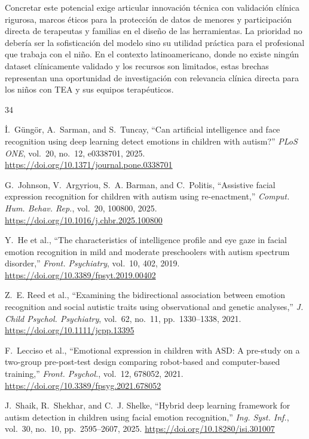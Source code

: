 \documentclass[3p,twocolumn,times]{elsarticle}
\begin{document}
	Concretar este potencial exige articular innovación técnica con validación clínica
	rigurosa, marcos éticos para la protección de datos de menores y participación
	directa de terapeutas y familias en el diseño de las herramientas. La prioridad
	no debería ser la sofisticación del modelo sino su utilidad práctica para el
	profesional que trabaja con el niño. En el contexto latinoamericano, donde no
	existe ningún dataset clínicamente validado y los recursos son limitados, estas
	brechas representan una oportunidad de investigación con relevancia clínica
	directa para los niños con TEA y sus equipos terapéuticos.
	
	\begin{thebibliography}{34}
		
		İ.~Güngör, A.~Sarman, and S.~Tuncay,
		``Can artificial intelligence and face recognition using deep learning detect
		emotions in children with autism?''
		\textit{PLoS ONE}, vol.~20, no.~12, e0338701, 2025.
		\url{https://doi.org/10.1371/journal.pone.0338701}
		
		G.~Johnson, V.~Argyriou, S.~A. Barman, and C.~Politis,
		``Assistive facial expression recognition for children with autism using
		re-enactment,''
		\textit{Comput. Hum. Behav. Rep.}, vol.~20, 100800, 2025.
		\url{https://doi.org/10.1016/j.chbr.2025.100800}
		
		Y.~He et al.,
		``The characteristics of intelligence profile and eye gaze in facial emotion
		recognition in mild and moderate preschoolers with autism spectrum disorder,''
		\textit{Front. Psychiatry}, vol.~10, 402, 2019.
		\url{https://doi.org/10.3389/fpsyt.2019.00402}
		
		Z.~E. Reed et al.,
		``Examining the bidirectional association between emotion recognition and social
		autistic traits using observational and genetic analyses,''
		\textit{J. Child Psychol. Psychiatry}, vol.~62, no.~11, pp.~1330--1338, 2021.
		\url{https://doi.org/10.1111/jcpp.13395}
		
		F.~Lecciso et al.,
		``Emotional expression in children with ASD: A pre-study on a two-group
		pre-post-test design comparing robot-based and computer-based training,''
		\textit{Front. Psychol.}, vol.~12, 678052, 2021.
		\url{https://doi.org/10.3389/fpsyg.2021.678052}
		
		J.~Shaik, R.~Shekhar, and C.~J. Shelke,
		``Hybrid deep learning framework for autism detection in children using facial
		emotion recognition,''
		\textit{Ing. Syst. Inf.}, vol.~30, no.~10, pp.~2595--2607, 2025.
		\url{https://doi.org/10.18280/isi.301007}
		

\end{thebibliography}
\end{document}

